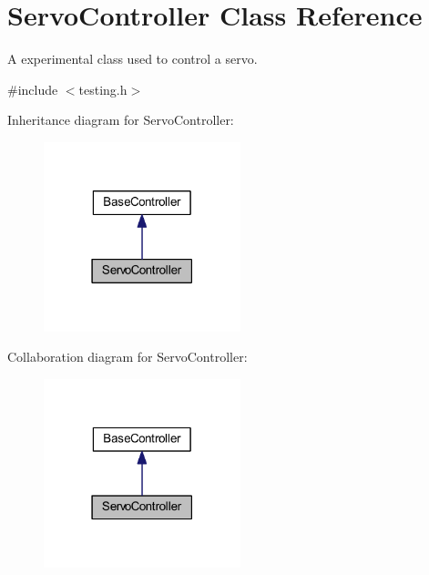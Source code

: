 \hypertarget{class_servo_controller}{\section{\-Servo\-Controller \-Class \-Reference}
\label{class_servo_controller}
}


\-A experimental class used to control a servo.  




{\ttfamily \#include $<$testing.\-h$>$}



\-Inheritance diagram for \-Servo\-Controller\-:\nopagebreak
\begin{figure}[H]
\begin{center}
\leavevmode
\includegraphics[width=162pt]{class_servo_controller__inherit__graph}
\end{center}
\end{figure}


\-Collaboration diagram for \-Servo\-Controller\-:\nopagebreak
\begin{figure}[H]
\begin{center}
\leavevmode
\includegraphics[width=162pt]{class_servo_controller__coll__graph}
\end{center}
\end{figure}
